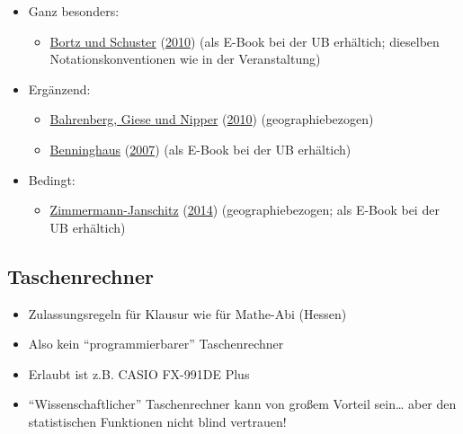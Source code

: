 \documentclass[
  11pt,
  ngerman,
  a4paper,
]{report}
\providecommand{\tightlist}{%
  \setlength{\itemsep}{0pt}\setlength{\parskip}{0pt}}
\begin{document}
\begin{itemize}
\tightlist
\item
  Ganz besonders:

  \begin{itemize}
  \tightlist
  \item
    \protect\hyperlink{ref-bortz}{Bortz und Schuster} (\protect\hyperlink{ref-bortz}{2010}) (als E-Book bei der UB erhältich; dieselben Notationskonventionen wie in der Veranstaltung)
  \end{itemize}
\item
  Ergänzend:

  \begin{itemize}
  \tightlist
  \item
    \protect\hyperlink{ref-bahrenberg}{Bahrenberg, Giese und Nipper} (\protect\hyperlink{ref-bahrenberg}{2010}) (geographiebezogen)
  \item
    \protect\hyperlink{ref-benninghaus}{Benninghaus} (\protect\hyperlink{ref-benninghaus}{2007}) (als E-Book bei der UB erhältich)
  \end{itemize}
\item
  Bedingt:

  \begin{itemize}
  \tightlist
  \item
    \protect\hyperlink{ref-zimmermann-janschitz2014a}{Zimmermann-Janschitz} (\protect\hyperlink{ref-zimmermann-janschitz2014a}{2014}) (geographiebezogen; als E-Book bei der UB erhältich)
  \end{itemize}
\end{itemize}

\hypertarget{taschenrechner}{%
\subsection*{Taschenrechner}\label{taschenrechner}}

\begin{itemize}
\tightlist
\item
  Zulassungsregeln für Klausur wie für Mathe-Abi (Hessen)
\item
  Also kein \enquote{programmierbarer} Taschenrechner
\item
  Erlaubt ist z.B. CASIO FX-991DE Plus
\item
  \enquote{Wissenschaftlicher} Taschenrechner kann von großem Vorteil sein\ldots{} aber den statistischen Funktionen nicht blind vertrauen!
\end{itemize}
\end{document}
